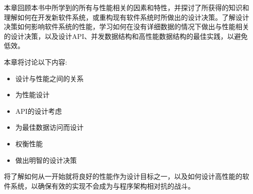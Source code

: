 本章回顾本书中所学到的所有与性能相关的因素和特性，并探讨了所获得的知识和理解如何在开发新软件系统，或重构现有软件系统时所做出的设计决策。了解设计决策如何影响软件系统的性能，学习如何在没有详细数据的情况下做出与性能相关的设计决策，以及设计API、并发数据结构和高性能数据结构的最佳实践，以避免低效。

本章将讨论以下内容:

\begin{itemize}
\item 
设计与性能之间的关系

\item 
为性能设计

\item 
API的设计考虑

\item 
为最佳数据访问而设计

\item 
权衡性能

\item 
做出明智的设计决策
\end{itemize}

将了解如何从一开始就将良好的性能作为设计目标之一，以及如何设计高性能的软件系统，以确保有效的实现不会成为与程序架构相对抗的战斗。